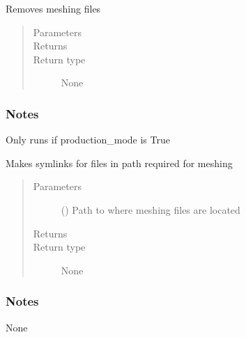 \documentclass[letterpaper,10pt,english]{sphinxmanual}
\begin{document}
\begin{fulllineitems}
\label{\detokenize{pydfnworks:pydfnworks.dfnGen.mesh_dfn_helper.cleanup_dir}}
Removes meshing files
\begin{quote}\begin{description}
\item[{Parameters}] \leavevmode
{} \textendash{} 

\item[{Returns}] \leavevmode


\item[{Return type}] \leavevmode
None

\end{description}\end{quote}
\subsubsection*{Notes}

Only runs if production\_mode is True

\end{fulllineitems}


\begin{fulllineitems}
\label{\detokenize{pydfnworks:pydfnworks.dfnGen.mesh_dfn_helper.create_mesh_links}}
Makes symlinks for files in path required for meshing
\begin{quote}\begin{description}
\item[{Parameters}] \leavevmode
{} () \textendash{} Path to where meshing files are located

\item[{Returns}] \leavevmode


\item[{Return type}] \leavevmode
None

\end{description}\end{quote}
\subsubsection*{Notes}

None

\end{fulllineitems}
\end{document}

